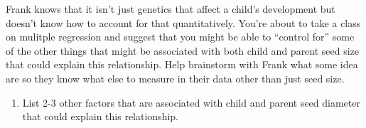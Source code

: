 \documentclass[]{article}
\providecommand{\tightlist}{%
  \setlength{\itemsep}{0pt}\setlength{\parskip}{0pt}}
\begin{document}
Frank knows that it isn't just genetics that affect a child's
development but doesn't know how to account for that quantitatively.
You're about to take a class on mulitple regression and suggest that you
might be able to ``control for'' some of the other things that might be
associated with both child and parent seed size that could explain this
relationship. Help brainstorm with Frank what some idea are so they know
what else to measure in their data other than just seed size.

\begin{enumerate}
\def\labelenumi{\arabic{enumi}.}
\tightlist
\item
  List 2-3 other factors that are associated with child and parent seed
  diameter that could explain this relationship.
\end{enumerate}

\newpage
\end{document}
